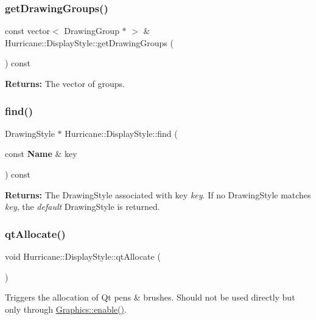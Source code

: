 \subsubsection{\texorpdfstring{get\+Drawing\+Groups()}{getDrawingGroups()}}
{\footnotesize\ttfamily const vector$<$ Drawing\+Group $\ast$ $>$ \& Hurricane\+::\+Display\+Style\+::get\+Drawing\+Groups (\begin{DoxyParamCaption}{ }\end{DoxyParamCaption}) const\hspace{0.3cm}{\ttfamily [inline]}}

{\bfseries Returns\+:} The vector of groups. \mbox{\label{classHurricane_1_1DisplayStyle_ac7a76fdc5cf9e9a74840b9846bd390fc}} 
\subsubsection{\texorpdfstring{find()}{find()}}
{\footnotesize\ttfamily Drawing\+Style $\ast$ Hurricane\+::\+Display\+Style\+::find (\begin{DoxyParamCaption}\item[{const \textbf{ Name} \&}]{key }\end{DoxyParamCaption}) const}

{\bfseries Returns\+:} The Drawing\+Style associated with key {\itshape key}. If no Drawing\+Style matches {\itshape key}, the {\itshape default} Drawing\+Style is returned. \mbox{\label{classHurricane_1_1DisplayStyle_a9288b2780ffd5fccf94a41b597ed2efd}} 
\subsubsection{\texorpdfstring{qt\+Allocate()}{qtAllocate()}}
{\footnotesize\ttfamily void Hurricane\+::\+Display\+Style\+::qt\+Allocate (\begin{DoxyParamCaption}{ }\end{DoxyParamCaption})}

Triggers the allocation of Qt pens \& brushes. Should not be used directly but only through \mbox{\hyperlink{classHurricane_1_1Graphics_a08e5240382c4bc97fd84b6fa0e7d8b8e}{Graphics\+::enable()}}. \mbox{\label{classHurricane_1_1DisplayStyle_ae21071635857843536511f21da5533c7}} 

